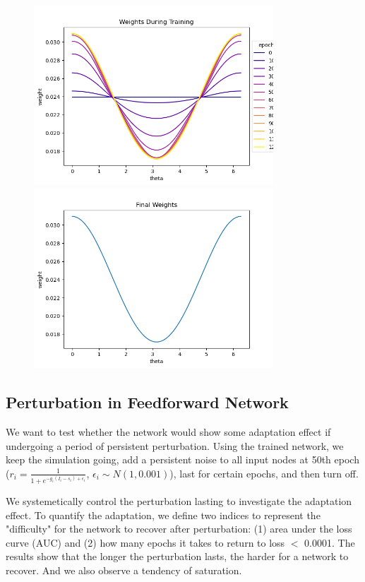 \documentclass[12pt, a4paper]{article}
\begin{document}
\begin{figure}[H]
    \centering
    \includegraphics[width=0.8\textwidth]{FNN/fig/0221_abb05_bphebb_timeweights.png} \\
    \includegraphics[width=0.8\textwidth]{FNN/fig/0221_abb05_bphebb_finalweights.png}
\end{figure}
\newpage

\subsection*{Perturbation in Feedforward Network}

We want to test whether the network would show some adaptation effect if undergoing a period of persistent perturbation. Using the trained network, we keep the simulation going, add a persistent noise to all input nodes at 50th epoch ($r_i = \frac{1}{1 + e^{-g_i(I_i-s_i) + \epsilon_i}}$, $\epsilon_i \sim N(1,0.001)$), last for certain epochs, and then turn off.

We systemetically control the perturbation lasting to investigate the adaptation effect. To quantify the adaptation, we define two indices to represent the "difficulty" for the network to recover after perturbation: (1) area under the loss curve (AUC) and (2) how many epochs it takes to return to loss $<$ 0.0001. The results show that the longer the perturbation lasts, the harder for a network to recover. And we also observe a tendency of saturation.
\end{document}
